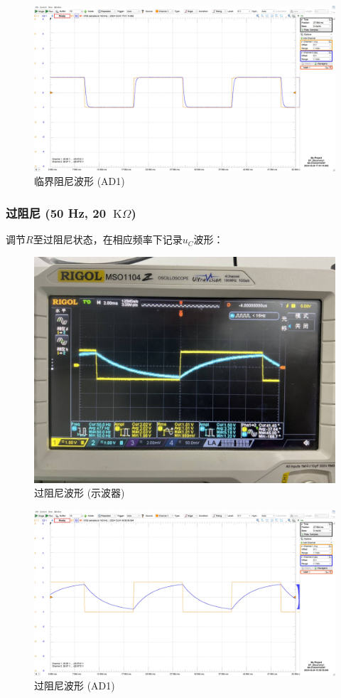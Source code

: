 \documentclass[UTF8]{article}
\def\KO{\ \mathrm{K}\Omega}
\theoremstyle{MyLineTheoremStyle} %
\theoremstyle{MyBlockTheoremStyle} %
\theoremstyle{MySubsubsectionStyle} %
\begin{document}
\begin{figure}[H]\centering
    \includegraphics[width=0.9\columnwidth]{assets/3/20241224 RLC 实验, RLC 暂态, 50Hz 1410 Ohm 临界阻尼.png}
    \caption{临界阻尼波形 (AD1)}
\end{figure}

\subsubsection{过阻尼 (50 Hz, 20 $\KO$)}


调节$ R $至过阻尼状态，在相应频率下记录$ u_C $波形：
\begin{figure}[H]\centering
    \includegraphics[width=0.9\columnwidth]{assets/3/2c252ca3fcad60a9e464d10f86af03e1_720.png}
    \caption{过阻尼波形 (示波器)}
\end{figure}

\begin{figure}[H]\centering
    \includegraphics[width=0.9\columnwidth]{assets/3/20241224 RLC 实验, RLC 暂态, 50Hz 20K Ohm 过阻尼.png}
    \caption{过阻尼波形 (AD1)}
\end{figure}
\end{document}
